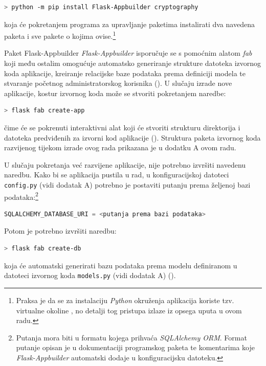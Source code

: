 \documentclass[times, utf8, diplomski]{fer}
\begin{document}
\begin{lstlisting}[language=bash,basicstyle=\small\ttfamily,columns=flexible]
 > python -m pip install Flask-Appbuilder cryptography
\end{lstlisting}

\noindent koja će pokretanjem programa za upravljanje paketima instalirati dva
navedena paketa i sve pakete o kojima ovise.\footnote{Praksa je da se za
    instalaciju \emph{Python} okruženja aplikacija koriste tzv. virtualne
    okoline , no detalji tog pristupa izlaze iz opsega uputa
    u ovom radu.}

Paket Flask-Appbuilder \emph{Flask-Appbuilder} isporučuje se s pomoćnim alatom
\emph{fab} koji među ostalim omogućuje automatsko generiranje strukture datoteka
izvornog koda aplikacije, kreiranje relacijske baze podataka prema definiciji
modela te stvaranje početnog administratorskog korisnika (\cite{fab}). U slučaju
izrade nove aplikacije, kostur izvornog koda može se stvoriti pokretanjem
naredbe:

\begin{lstlisting}[language=bash,basicstyle=\small\ttfamily,columns=flexible]
 > flask fab create-app
\end{lstlisting}

\noindent čime će se pokrenuti interaktivni alat koji će stvoriti strukturu
direktorija i datoteka predviđenih za izvorni kod aplikacije (\cite{fab}).
Struktura paketa izvornog koda razvijenog tijekom izrade ovog rada prikazana je
u dodatku A ovom radu.

U slučaju pokretanja već razvijene aplikacije, nije potrebno izvršiti navedenu
naredbu. Kako bi se aplikacija pustila u rad, u konfiguracijskoj datoteci
\texttt{config.py} (vidi dodatak A) potrebno je postaviti putanju prema željenoj
bazi podataka:\footnote{Putanja mora biti u formatu kojega prihvaća
    \emph{SQLAlchemy ORM}. Format putanje opisan je u dokumentaciji programskog
    paketa te komentarima koje \emph{Flask-Appbuilder} automatski dodaje u
    konfiguracijsku datoteku.}
\begin{lstlisting}[language=python,basicstyle=\small\ttfamily,columns=flexible]
SQLALCHEMY_DATABASE_URI = <putanja prema bazi podataka>
\end{lstlisting}

Potom je potrebno izvršiti naredbu:
\begin{lstlisting}[language=bash,basicstyle=\small\ttfamily,columns=flexible]
 > flask fab create-db
\end{lstlisting}
\noindent koja će automatski generirati bazu podataka prema modelu definiranom u
datoteci izvornog koda \texttt{models.py} (vidi dodatak A) (\cite{fab}).
\end{document}
